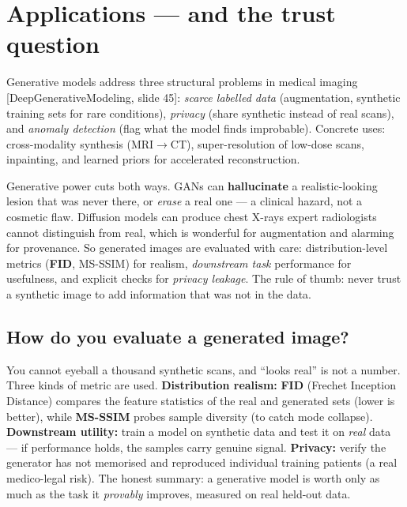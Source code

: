 \documentclass[11pt]{article}
\newcommand{\deck}[1]{\textsf{\small[#1]}}
\begin{document}
\section{Applications --- and the trust question}

Generative models address three structural problems in medical imaging
\deck{DeepGenerativeModeling, slide 45}: \emph{scarce labelled data}
(augmentation, synthetic training sets for rare conditions), \emph{privacy}
(share synthetic instead of real scans), and \emph{anomaly detection} (flag what
the model finds improbable). Concrete uses: cross-modality synthesis (MRI$\to$CT),
super-resolution of low-dose scans, inpainting, and learned priors for
accelerated reconstruction.

\begin{notebox}
Generative power cuts both ways. GANs can \textbf{hallucinate} a realistic-looking
lesion that was never there, or \emph{erase} a real one --- a clinical hazard, not
a cosmetic flaw. Diffusion models can produce chest X-rays expert radiologists
cannot distinguish from real, which is wonderful for augmentation and alarming for
provenance. So generated images are evaluated with care: distribution-level
metrics (\textbf{FID}, MS-SSIM) for realism, \emph{downstream task} performance
for usefulness, and explicit checks for \emph{privacy leakage}. The rule of
thumb: never trust a synthetic image to add information that was not in the data.
\end{notebox}

\subsection{How do you evaluate a generated image?}

You cannot eyeball a thousand synthetic scans, and ``looks real'' is not a
number. Three kinds of metric are used. \textbf{Distribution realism:}
\textbf{FID} (Frechet Inception Distance) compares the feature statistics of the
real and generated sets (lower is better), while \textbf{MS-SSIM} probes sample
diversity (to catch mode collapse). \textbf{Downstream utility:} train a model on
synthetic data and test it on \emph{real} data --- if performance holds, the
samples carry genuine signal. \textbf{Privacy:} verify the generator has not
memorised and reproduced individual training patients (a real medico-legal risk).
The honest summary: a generative model is worth only as much as the task it
\emph{provably} improves, measured on real held-out data.
\end{document}
